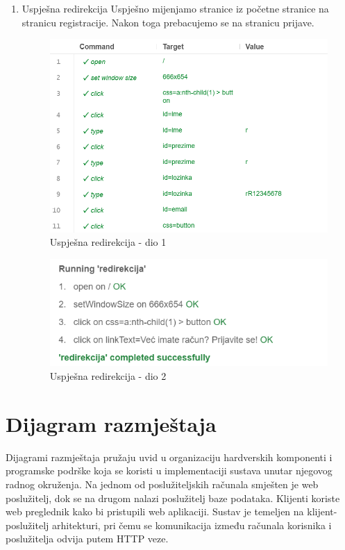 \begin{enumerate}
				\item Uspješna redirekcija\newline
				Uspješno mijenjamo stranice iz početne stranice na stranicu registracije. Nakon toga prebacujemo se na stranicu prijave.
				\begin{figure}[H]
					\includegraphics[scale=0.40]{slike/deploy/fTest4a.png}
					\centering
					\caption{Uspješna redirekcija - dio 1}
					\label{fig:fTest4a}
				\end{figure}
				\begin{figure}[H]
					\includegraphics[scale=0.40]{slike/deploy/fTest4b.png}
					\centering
					\caption{Uspješna redirekcija - dio 2}
					\label{fig:fTest4b}
				\end{figure}
			\end{enumerate}
			\eject
		
		
		\section{Dijagram razmještaja}

			Dijagrami razmještaja pružaju uvid u organizaciju hardverskih komponenti i programske podrške koja se koristi u implementaciji sustava unutar njegovog radnog okruženja. Na jednom od poslužiteljskih računala smješten je web poslužitelj, dok se na drugom nalazi poslužitelj baze podataka. Klijenti koriste web preglednik kako bi pristupili web aplikaciji. Sustav je temeljen na klijent-poslužitelj arhitekturi, pri čemu se komunikacija između računala korisnika i poslužitelja odvija putem HTTP veze.
			
